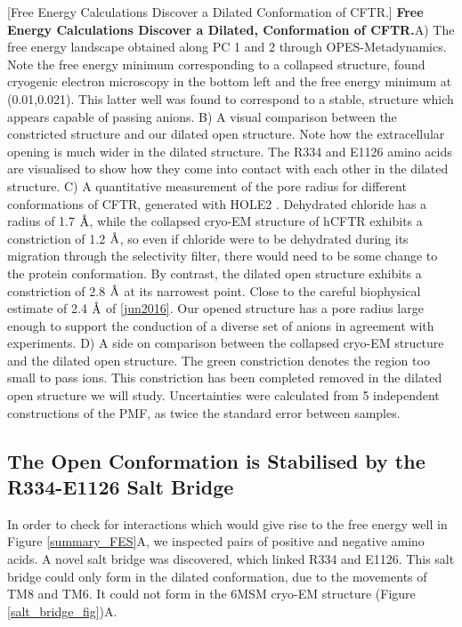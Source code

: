 	[Free Energy Calculations Discover a Dilated Conformation of CFTR.] {\textbf{Free Energy Calculations Discover a Dilated, Conformation of CFTR.}}{A) The free energy landscape obtained along PC 1 and 2 through OPES-Metadynamics. Note the free energy minimum corresponding to a collapsed structure, found cryogenic electron microscopy in the bottom left and the free energy minimum at (0.01,0.021). This latter well was found to correspond to a stable, structure which appears capable of passing anions. B) A visual comparison between the constricted structure and our dilated open structure. Note how the extracellular opening is much wider in the dilated structure. The R334 and E1126 amino acids are visualised to show how they come into contact with each other in the dilated structure. C) A quantitative measurement of the pore radius for different conformations of CFTR, generated with HOLE2 \cite{smart1996}. Dehydrated chloride has a radius of 1.7 $\textup{\AA}$, while the collapsed cryo-EM structure of hCFTR exhibits a constriction of 1.2 $\textup{\AA}$, so even if chloride were to be dehydrated during its migration through the selectivity filter, there would need to be some change to the protein conformation. By contrast, the dilated open structure exhibits a constriction of 2.8 $\textup{\AA}$ at its  narrowest point. Close to the careful biophysical estimate of 2.4 $\textup{\AA}$ of \ref{jun2016}. Our opened structure has a pore radius large enough to support the conduction of a diverse set of anions in agreement with experiments.  D) A side on comparison between the collapsed cryo-EM structure and the dilated open structure. The green constriction denotes the region too small to pass ions. This constriction has been completed removed in the dilated open structure we will study. Uncertainties were calculated from 5 independent constructions of the PMF, as twice the standard error between samples.}
	\label{summary_FES}
	\endgroup


\subsection{The Open Conformation is Stabilised by the R334-E1126 Salt Bridge}
\label{salt_bridge}

In order to check for interactions which would give rise to the free energy well in Figure \ref{summary_FES}A, we inspected pairs of positive and negative amino acids. A novel salt bridge was discovered, which linked R334 and  E1126. This salt bridge could only form in the dilated conformation, due to the movements of TM8 and TM6. It could not form in the 6MSM cryo-EM structure (Figure \ref{salt_bridge_fig})A. 

